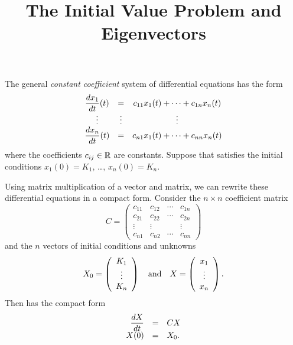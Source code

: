 \documentclass{ximera}
\title{The Initial Value Problem and Eigenvectors}
\begin{document}
\begin{abstract}
\end{abstract}
\maketitle


\label{S:IVP&E} 

The general {\em constant coefficient\/}
system of differential equations has the form
\renewcommand{\arraystretch}{1.8}
\begin{equation}\label{lingen}
\begin{array}{ccc}
\displaystyle \frac{dx_1}{dt}(t) & = & c_{11}x_1(t) + \cdots + c_{1n}x_n(t) \\
\vdots  & \vdots & \vdots \\
\displaystyle \frac{dx_n}{dt}(t) & = & c_{n1}x_1(t) + \cdots + c_{nn}x_n(t)
\end{array}
\end{equation}
\renewcommand{\arraystretch}{1.0}%
where the coefficients $c_{ij}\in \mbox{$\Bbb{R}$}$ are constants.  Suppose that 
 satisfies the initial conditions $x_1(0) = K_1$, \ldots,  
$x_n(0) = K_n$.

Using matrix multiplication of a vector and matrix, we can rewrite these 
differential equations in a compact form.   Consider the $n\times n$ 
coefficient matrix
\[
C = \left(
\begin{array}{rrrr}
 c_{11} & c_{12} & \cdots & c_{1n} \\
 c_{21} & c_{22} & \cdots & c_{2n}  \\
 \vdots & \vdots &        & \vdots  \\
 c_{n1} & c_{n2} & \cdots & c_{nn}
\end{array}
\right)
\]
and the $n$ vectors of initial conditions and unknowns
\[
X_0=\left(
\begin{array}{ccc}
K_1 \\ \vdots  \\ K_n
\end{array}
\right) \quad\mbox{and}\quad
X=\left(
\begin{array}{ccc}
x_1 \\ \vdots  \\ x_n
\end{array}
\right).
\]
Then  has the compact form
\begin{equation}  \label{E:geneqn}
\begin{array}{rcl}
\displaystyle\frac{dX}{dt} & = & CX\\
X(0) & = & X_0.  
\end{array}
\end{equation}
\end{document}
